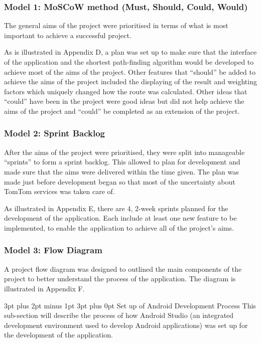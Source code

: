 \documentclass[12pt,a4paper]{article}
\makeatletter
\renewcommand\subsection{\@startsection {subsection}{1}{0mm} %
                               {3pt plus 2pt minus 1pt} %
                               {3pt plus 0pt} %
                               {\normalfont\bfseries}}
\makeatother
\begin{document}
\subsubsection{Model 1: MoSCoW method (Must, Should, Could, Would)}
The general aims of the project were prioritised in terms of what is most important to achieve a successful project. 

As is illustrated in Appendix D, a plan was set up to make sure that the interface of the application and the shortest path-finding algorithm would be developed to achieve most of the aims of the project. Other features that \enquote{should} be added to achieve the aims of the project included the displaying of the result and weighting factors which uniquely changed how the route was calculated. Other ideas that \enquote{could} have been in the project were good ideas but did not help achieve the aims of the project and \enquote{could} be completed as an extension of the project.

\subsubsection{Model 2: Sprint Backlog}
After the aims of the project were prioritised, they were split into manageable \enquote{sprints} to form a sprint backlog. This allowed to plan for development and made sure that the aims were delivered within the time given. The plan was made just before development began so that most of the uncertainty about TomTom services was taken care of. 

As illustrated in Appendix E, there are 4, 2-week sprints planned for the development of the application. Each include at least one new feature to be implemented, to enable the application to achieve all of the project's aims. 

\subsubsection{Model 3: Flow Diagram}
A project flow diagram was designed to outlined the main components of the project to better understand the process of the application. The diagram is illustrated in Appendix F.

\subsection{Set up of Android Development Process}
This sub-section will describe the process of how Android Studio (an integrated development environment used to develop Android applications) was set up for the development of the application.
\end{document}
